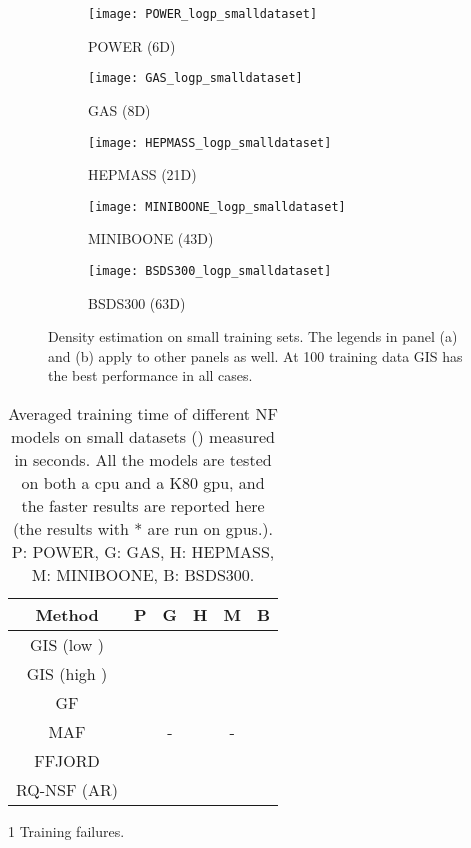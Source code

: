 \documentclass{article}
\begin{document}
\begin{figure}[t]
     \centering
     \begin{subfigure}[t]{0.49\linewidth}
         \texttt{[image: POWER\_logp\_smalldataset]}
         \caption{POWER (6D)}
     \end{subfigure}
     \begin{subfigure}[t]{0.49\linewidth}
         \texttt{[image: GAS\_logp\_smalldataset]}
         \caption{GAS (8D)}
     \end{subfigure}
     \begin{subfigure}[t]{0.49\linewidth}
         \texttt{[image: HEPMASS\_logp\_smalldataset]}
         \caption{HEPMASS (21D)}
     \end{subfigure}
     \begin{subfigure}[t]{0.49\linewidth}
         \texttt{[image: MINIBOONE\_logp\_smalldataset]}
         \caption{MINIBOONE (43D)}
     \end{subfigure}
     \begin{subfigure}[t]{0.49\linewidth}
         \texttt{[image: BSDS300\_logp\_smalldataset]}
         \caption{BSDS300 (63D)}
     \end{subfigure}
        \caption{Density estimation on small training sets. The legends in panel (a) and (b) apply to other panels as well. At 100 training data GIS has the best performance in all cases.
        }
        \label{fig:density}
      \vskip -0.1in
\end{figure}

\begin{table}[htb]
  \caption{Averaged training time of different NF models on small datasets () measured in seconds. All the models are tested on both a cpu and a K80 gpu, and the faster results are reported here (the results with * are run on gpus.). P: POWER, G: GAS, H: HEPMASS, M: MINIBOONE, B: BSDS300.}
  \label{tab:time}
  \vskip 0.15in
  \centering
  \begin{threeparttable}
  \begin{tabular}{>{\centering}c|>{\centering}c>{\centering}c>{\centering}c>{\centering}c>{\centering\arraybackslash}c}
    \toprule
    Method & P & G & H & M & B\\
    \midrule\midrule
    GIS (low ) &  &  &  &  &   \\
    GIS (high ) &  &  &  &  & \\
    GF &  &  &  &  &  \\
    MAF &  & -\tnote{1} &  & -\tnote{1} &  \\
    FFJORD &  &  &  &  &  \\
    RQ-NSF (AR) &  &  &  &  & \\
    \bottomrule
  \end{tabular}
  \begin{tablenotes}
  \item[1] Training failures.
  \end{tablenotes}
  \end{threeparttable}
  \vskip -0.1in
\end{table}
\end{document}

